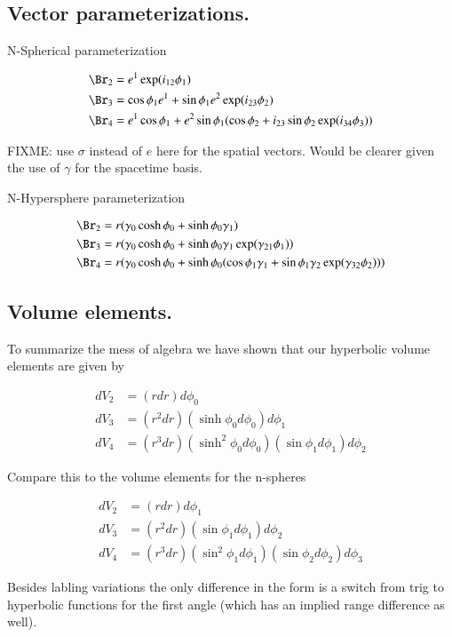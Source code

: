 \documentclass{article}
\begin{document}
\subsection{ Vector parameterizations. }

N-Spherical parameterization

\begin{align}
\Br_2 &= e^1 \exp( i_{12} \phi_1 ) \\
\Br_3 &= \cos\phi_1 e^1 + \sin\phi_1 e^2 \exp( i_{23} \phi_2 ) \\
\Br_4 &= e^1 \cos\phi_1 + e^2 \sin\phi_1 (\cos\phi_2 + i_{23} \sin\phi_2 \exp(i_{34}\phi_3) ) 
\end{align}

FIXME: use $\sigma$ instead of $e$ here for the spatial vectors.  Would be clearer given the use of $\gamma$ for the spacetime basis.

N-Hypersphere parameterization

\begin{align}
\Br_2 &= r (\gamma_0 \cosh \phi_0 + \sinh\phi_0 \gamma_1) \\
\Br_3 &= r (\gamma_0 \cosh \phi_0 + \sinh\phi_0 \gamma_1 \exp( \gamma_{21} \phi_1 ) ) \\
\Br_4 &= r (\gamma_0 \cosh \phi_0 + \sinh\phi_0 ( \cos\phi_1 \gamma_1 + \sin\phi_1 \gamma_2 \exp( \gamma_{32} \phi_2 )) )
\end{align}

\subsection{ Volume elements. }

To summarize the mess of algebra we have shown that our hyperbolic volume elements are given by

\begin{align}
dV_2 &= \left(r dr\right) d\phi_0 \\
dV_3 &= \left(r^2 dr\right) \left(\sinh\phi_0 d\phi_0\right) d\phi_1 \\
dV_4 &= \left(r^3 dr\right) \left(\sinh^2 \phi_0 d\phi_0\right) \left(\sin\phi_1 d\phi_1\right) d\phi_2
\end{align}

Compare this to the volume elements for the n-spheres

\begin{align}
dV_2 &= \left(r dr\right) d\phi_1 \\
dV_3 &= \left(r^2 dr\right) \left(\sin\phi_1 d\phi_1\right) d\phi_2 \\
dV_4 &= \left(r^3 dr\right) \left(\sin^2\phi_1 d\phi_1\right) \left(\sin\phi_2 d\phi_2\right) d\phi_3 
\end{align}

Besides labling variations the only difference in the form is a switch from trig to hyperbolic functions for the first angle (which has an implied
range difference as well).



\end{document}
